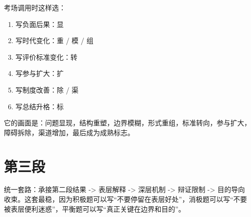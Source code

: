 ﻿\documentclass[lang=cn,11pt]{elegantbook}
\begin{document}
\begin{note}
考场调用时这样选：

\begin{enumerate}
  \item 写负面后果：显
  \item 写时代变化：重 / 模 / 组
  \item 写评价标准变化：转
  \item 写参与扩大：扩
  \item 写制度改善：除 / 渠
  \item 写总结升格：标
\end{enumerate}

它的画面是：问题显现，结构重塑，边界模糊，形式重组，标准转向，参与扩大，障碍拆除，渠道增加，最后成为成熟标志。
\end{note}

\section{第三段}
统一套路：承接第二段结果 -> 表层解释 -> 深层机制 -> 辩证限制 -> 目的导向收束。这套最稳，因为积极题可以写“不要停留在表层好处”，消极题可以写“不要被表层便利迷惑”，平衡题可以写“真正关键在边界和目的”。
\end{document}
